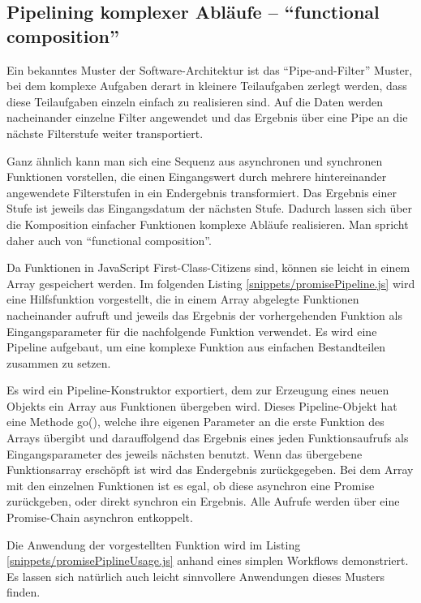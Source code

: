 \documentclass[
11pt, %
a4paper, %
oneside, %
pdfspacing, %
headinclude,
BCOR5mm, %
ngerman, %
bibtotocnumbered,
]{scrartcl}
\begin{document}
	
	
	\subsection{Pipelining komplexer Abläufe -- "`functional composition"'}
	
	Ein bekanntes Muster der Software-Architektur ist das "`Pipe-and-Filter"' Muster, bei dem komplexe Aufgaben derart in kleinere Teilaufgaben zerlegt werden, dass diese Teilaufgaben einzeln einfach zu realisieren sind. Auf die Daten werden nacheinander einzelne Filter angewendet und das Ergebnis über eine Pipe an die nächste Filterstufe weiter transportiert.
	
	Ganz ähnlich kann man sich eine Sequenz aus asynchronen und synchronen Funktionen vorstellen, die einen Eingangswert durch mehrere hintereinander angewendete Filterstufen in ein Endergebnis transformiert. Das Ergebnis einer Stufe ist jeweils das Eingangsdatum der nächsten Stufe. Dadurch lassen sich über die Komposition einfacher Funktionen komplexe Abläufe realisieren. Man spricht daher auch von "`functional composition"'.
	
	Da Funktionen in JavaScript First-Class-Citizens sind, können sie leicht in einem Array gespeichert werden. Im folgenden Listing \ref{snippets/promisePipeline.js} wird eine Hilfsfunktion vorgestellt, die in einem Array abgelegte Funktionen nacheinander aufruft und jeweils das Ergebnis der vorhergehenden Funktion als Eingangsparameter für die nachfolgende Funktion verwendet. Es wird eine Pipeline aufgebaut, um eine komplexe Funktion aus einfachen Bestandteilen zusammen zu setzen.
	
		
	
	Es wird ein Pipeline-Konstruktor exportiert, dem zur Erzeugung eines neuen Objekts ein Array aus Funktionen übergeben wird. Dieses Pipeline-Objekt hat eine Methode \textsf{go()}, welche ihre eigenen Parameter an die erste Funktion des Arrays übergibt und darauffolgend das Ergebnis eines jeden Funktionsaufrufs als Eingangsparameter des jeweils nächsten benutzt. Wenn das übergebene Funktionsarray erschöpft ist wird das Endergebnis zurückgegeben. Bei dem Array mit den einzelnen Funktionen ist es egal, ob diese asynchron eine Promise zurückgeben, oder direkt synchron ein Ergebnis. Alle Aufrufe werden über eine Promise-Chain asynchron entkoppelt.
	
	Die Anwendung der vorgestellten Funktion wird im Listing \ref{snippets/promisePiplineUsage.js} anhand eines simplen Workflows demonstriert. Es lassen sich natürlich auch leicht sinnvollere Anwendungen dieses Musters finden.
	
\end{document}
